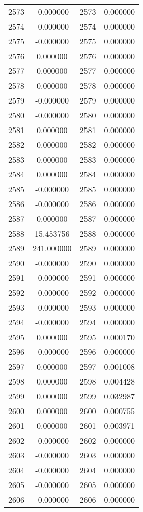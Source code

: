 \documentclass[12pt]{article}
\begin{document}
\begin{longtable}{@{}cccc@{}}
2573 & -0.000000 & 2573 & 0.000000 \\
2574 & -0.000000 & 2574 & 0.000000 \\
2575 & -0.000000 & 2575 & 0.000000 \\
2576 & 0.000000 & 2576 & 0.000000 \\
2577 & 0.000000 & 2577 & 0.000000 \\
2578 & 0.000000 & 2578 & 0.000000 \\
2579 & -0.000000 & 2579 & 0.000000 \\
2580 & -0.000000 & 2580 & 0.000000 \\
2581 & 0.000000 & 2581 & 0.000000 \\
2582 & 0.000000 & 2582 & 0.000000 \\
2583 & 0.000000 & 2583 & 0.000000 \\
2584 & 0.000000 & 2584 & 0.000000 \\
2585 & -0.000000 & 2585 & 0.000000 \\
2586 & -0.000000 & 2586 & 0.000000 \\
2587 & 0.000000 & 2587 & 0.000000 \\
2588 & 15.453756 & 2588 & 0.000000 \\
2589 & 241.000000 & 2589 & 0.000000 \\
2590 & -0.000000 & 2590 & 0.000000 \\
2591 & -0.000000 & 2591 & 0.000000 \\
2592 & -0.000000 & 2592 & 0.000000 \\
2593 & -0.000000 & 2593 & 0.000000 \\
2594 & -0.000000 & 2594 & 0.000000 \\
2595 & 0.000000 & 2595 & 0.000170 \\
2596 & -0.000000 & 2596 & 0.000000 \\
2597 & 0.000000 & 2597 & 0.001008 \\
2598 & 0.000000 & 2598 & 0.004428 \\
2599 & 0.000000 & 2599 & 0.032987 \\
2600 & 0.000000 & 2600 & 0.000755 \\
2601 & 0.000000 & 2601 & 0.003971 \\
2602 & -0.000000 & 2602 & 0.000000 \\
2603 & -0.000000 & 2603 & 0.000000 \\
2604 & -0.000000 & 2604 & 0.000000 \\
2605 & -0.000000 & 2605 & 0.000000 \\
2606 & -0.000000 & 2606 & 0.000000 \\

\end{longtable}
\end{document}
